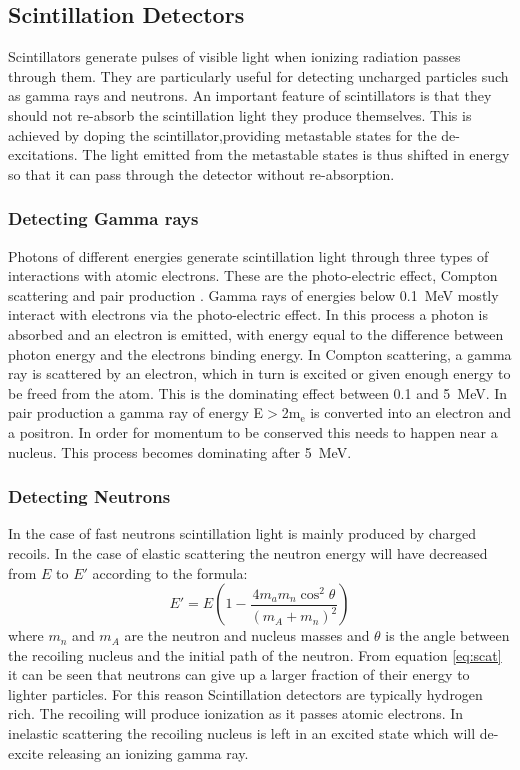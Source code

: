 \documentclass[main.tex]{subfiles}
\begin{document}
	
\subsection{Scintillation Detectors}
Scintillators generate pulses of visible light when ionizing radiation passes through them. They are particularly useful for detecting uncharged particles such as gamma rays and neutrons. An important feature of scintillators is that they should not re-absorb the scintillation light they produce themselves. This is achieved by doping the scintillator,providing metastable states for the de-excitations. The light emitted from the metastable states is thus shifted in energy so that it can pass through the detector without re-absorption. 

\subsubsection{Detecting Gamma rays}
Photons of different energies generate scintillation light through three types of interactions with atomic electrons. These are the photo-electric effect, Compton scattering and pair production \cite{Krane}. Gamma rays of energies below \SI{0.1}{\MeV} mostly interact with electrons via the photo-electric effect. In this process a photon is absorbed and an electron is emitted, with energy equal to the difference between photon energy and the electrons binding energy. In Compton scattering, a gamma ray is scattered by an electron, which in turn is excited or given enough energy to be freed from the atom. This is the dominating effect between 0.1 and \SI{5}{\MeV}. In pair production a gamma ray of energy E$>$2m$_\text{e}$ is converted into an electron and a positron. In order for momentum to be conserved this needs to happen near a nucleus. This process becomes dominating after \SI{5}{\MeV}\cite{Krane}.


\subsubsection{Detecting Neutrons}
In the case of fast neutrons scintillation light is mainly produced by charged recoils. In the case of elastic scattering the neutron energy will have decreased from $E$ to $E'$ according to the formula:
\begin{equation}
	E' = E\left(1 - \frac{4m_a m_n \cos^2{\theta}}{\left(m_A + m_n\right)^2}\right)
	\label{eq:scat}
\end{equation}
where $m_n$ and $m_A$ are the neutron and nucleus masses and $\theta$ is the angle between the recoiling nucleus and the initial path of the neutron. From equation \ref{eq:scat} it can be seen that neutrons can give up a larger fraction of their energy to lighter particles. For this reason Scintillation detectors are typically hydrogen rich. The recoiling will produce ionization as it passes atomic electrons. In inelastic scattering the recoiling nucleus is left in an excited state which will de-excite releasing an ionizing gamma ray.
\end{document}
